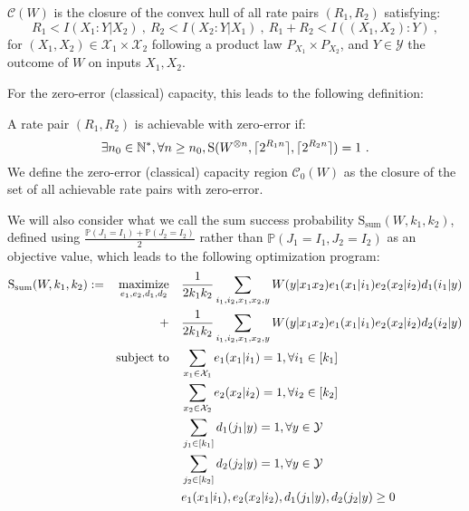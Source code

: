\begin{theorem}
  \label{theo:capacity}
  $\mathcal{C}(W)$ is the closure of the convex hull of all rate pairs $(R_1,R_2)$ satisfying:
  \[ R_1 < I(X_1:Y|X_2)\ ,\ R_2 < I(X_2:Y|X_1)\ ,\ R_1+R_2 < I((X_1,X_2):Y) \ ,\]
  for $(X_1,X_2) \in \mathcal{X}_1 \times \mathcal{X}_2$ following a product law $P_{X_1} \times P_{X_2}$, and $Y \in \mathcal{Y}$ the outcome of $W$ on inputs $X_1,X_2$.
\end{theorem}

For the zero-error (classical) capacity, this leads to the following definition:
\begin{definition}
  A rate pair $(R_1,R_2)$ is achievable with zero-error if:
  \[ \exists n_0  \in \mathbb{N}^*, \forall n \geq n_0, \mathrm{S}(W^{\otimes n},\lceil2^{R_1n}\rceil,\lceil2^{R_2n}\rceil) = 1 \ . \]
  We define the zero-error (classical) capacity region $\mathcal{C}_0(W)$ as the closure of the set of all achievable rate pairs with zero-error.
\end{definition}

We will also consider what we call the sum success probability $\mathrm{S}_{\text{sum}}(W,k_1,k_2)$, defined using $\frac{\mathbb{P}\left(J_1=I_1\right)+\mathbb{P}\left(J_2=I_2\right)}{2}$ rather than $\mathbb{P}\left(J_1=I_1,J_2=I_2\right)$ as an objective value, which leads to the following optimization program:
\begin{equation}
  \begin{aligned}
    \mathrm{S}_{\text{sum}}(W,k_1,k_2) := &&\underset{e_1,e_2,d_1,d_2}{\operatorname{\text{maximize}}} &&& \frac{1}{2k_1k_2} \sum_{i_1,i_2,x_1,x_2,y} W(y|x_1x_2)e_1(x_1|i_1)e_2(x_2|i_2)d_1(i_1|y)\\
    &&+&&& \frac{1}{2k_1k_2} \sum_{i_1,i_2,x_1,x_2,y} W(y|x_1x_2)e_1(x_1|i_1)e_2(x_2|i_2)d_2(i_2|y)\\
    &&\operatorname{\text{subject to}} &&& \sum_{x_1 \in \mathcal{X}_1} e_1(x_1|i_1) = 1, \forall i_1 \in [k_1]\\
    &&&&&  \sum_{x_2 \in \mathcal{X}_2} e_2(x_2|i_2) = 1, \forall i_2 \in [k_2]\\
    &&&&& \sum_{j_1 \in [k_1]} d_1(j_1|y) = 1, \forall y \in \mathcal{Y}\\
    &&&&& \sum_{j_2 \in [k_2]} d_2(j_2|y) = 1, \forall y \in \mathcal{Y}\\
    &&&&& e_1(x_1|i_1), e_2(x_2|i_2), d_1(j_1|y), d_2(j_2|y) \geq 0
  \end{aligned}
\end{equation}

